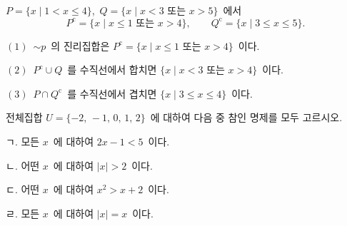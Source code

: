 \documentclass[10pt]{article}
\begin{document}
\begin{dmsolution}
$P = \{x \mid 1 < x \le 4\}$,\ $Q = \{x \mid x < 3 \text{ 또는 } x > 5\}$\ 에서
\[ P^\mathrm{c} = \{x \mid x \le 1 \text{ 또는 } x > 4\},\qquad Q^\mathrm{c} = \{x \mid 3 \le x \le 5\}. \]

$(1)$\ $\sim p$\ 의 진리집합은 $P^\mathrm{c} = \{x \mid x \le 1 \text{ 또는 } x > 4\}$\ 이다.

$(2)$\ $P^\mathrm{c} \cup Q$\ 를 수직선에서 합치면 $\{x \mid x < 3 \text{ 또는 } x > 4\}$\ 이다.

$(3)$\ $P \cap Q^\mathrm{c}$\ 를 수직선에서 겹치면 $\{x \mid 3 \le x \le 4\}$\ 이다.
\end{dmsolution}

\dmchecktitle



\newpage


\begin{dmproblem}
전체집합 $U = \{-2,\, -1,\, 0,\, 1,\, 2\}$\ 에 대하여 다음 중 참인 명제를 모두 고르시오.

\vspace{1mm}
\begin{dmoptionbox}
ㄱ. 모든 $x$\ 에 대하여 $2x - 1 < 5$\ 이다.

ㄴ. 어떤 $x$\ 에 대하여 $|x| > 2$\ 이다.

ㄷ. 어떤 $x$\ 에 대하여 $x^{2} > x + 2$\ 이다.

ㄹ. 모든 $x$\ 에 대하여 $|x| = x$\ 이다.
\end{dmoptionbox}
\end{dmproblem}
\end{document}
